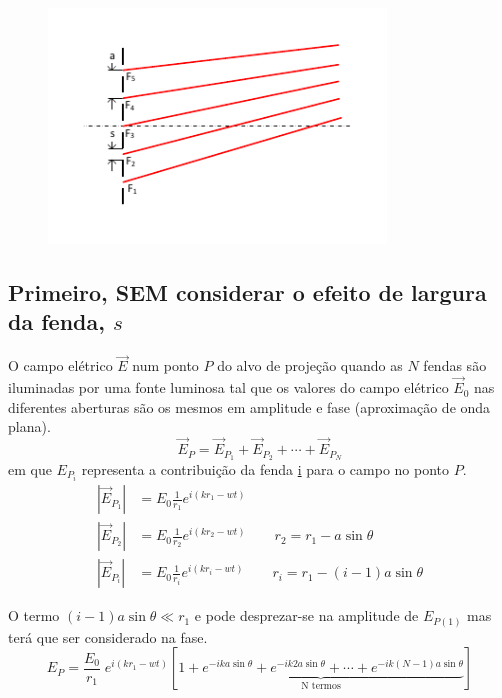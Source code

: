 \documentclass[a4paper,12pt]{article}
\begin{document}
\begin{figure}
	[!tb]  \centering 
	\includegraphics[width=0.8\textwidth]{Nfendas} \caption{\label{fig:6}} 
\end{figure}

\subsection{Primeiro, SEM considerar o efeito de largura da fenda, $s$}

O campo elétrico $\vec{E}$ num ponto $P$ do alvo de projeção quando as $N$ fendas são iluminadas por uma fonte luminosa tal que os valores do campo elétrico $\vec{E}_0$ nas diferentes aberturas são os mesmos em amplitude e fase (aproximação de onda plana).
\begin{equation}
	\label{eq:37} \vec{E}_P = \vec{E}_{P_1} + \vec{E}_{P_2} +\cdots +\vec{E}_{P_N} 
\end{equation}
em que $E_{P_i}$ representa a contribuição da fenda \underline{i} para o campo no ponto $P$. 
\begin{align}
	\label{eq:38} |\vec{E}_{P_1}| &= E_0 \frac{1}{r_1} e^{i(k r_1 -wt)} \nonumber \\
	|\vec{E}_{P_2}| &= E_0 \frac{1}{r_2} e^{i(k r_2 -wt)} \qquad r_2 = r_1 - a \sin \theta \\
	|\vec{E}_{P_i}| &= E_0 \frac{1}{r_i} e^{i(k r_i -wt)}\qquad r_i = r_1 - (i-1) a \sin \theta \nonumber 
\end{align}

O termo $(i-1) a \sin \theta \ll r_1$ e pode desprezar-se na amplitude de $E_{P(1)}$ mas terá que ser considerado na fase.
\begin{equation}
	\label{eq:39} E_P = \frac{E_0}{r_1} \; e^{i(k r_1 -wt)} \left[ \underbrace{1 + e^{-i k a \sin \theta} + e^{-i k 2 a \sin \theta} + \cdots + e^{-i k (N-1) a \sin \theta}}_{\text{N termos} }\right]
\end{equation}
\end{document}

